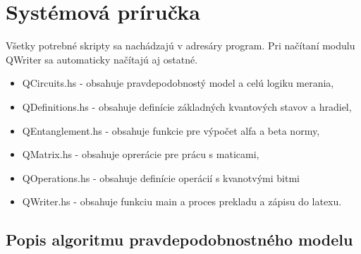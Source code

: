 
\chapter{Systémová príručka}

Všetky potrebné skripty sa nachádzajú v adresáry program. Pri načítaní modulu
QWriter sa automaticky načítajú aj ostatné. 
\begin{itemize}
    \item QCircuits.hs - obsahuje pravdepodobnostý model a celú logiku merania,
    \item QDefinitions.hs - obsahuje definície základných kvantových stavov a
hradiel,
    \item QEntanglement.hs - obsahuje funkcie pre výpočet alfa a beta normy,
    \item QMatrix.hs - obsahuje oprerácie pre prácu s maticami,
    \item QOperations.hs - obsahuje definície operácií s kvanotvými bitmi
    \item QWriter.hs - obsahuje funkciu main a proces prekladu a zápisu do
latexu.
\end{itemize}

\section{Popis algoritmu pravdepodobnostného modelu}

